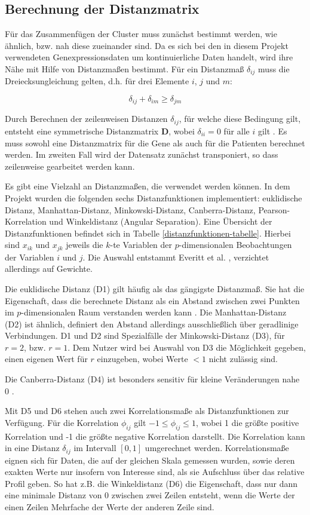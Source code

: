 \documentclass[12pt]{article}
\begin{document}
\subsection{Berechnung der Distanzmatrix}
\label{distanzfunktionen}
Für das Zusammenfügen der Cluster muss zunächst bestimmt werden, wie ähnlich, bzw. nah diese zueinander sind. Da es sich bei den in diesem Projekt verwendeten Genexpressionsdaten um kontinuierliche Daten handelt, wird ihre Nähe mit Hilfe von Distanzmaßen bestimmt. Für ein Distanzmaß $\delta_{ij}$ muss die Dreiecksungleichung gelten, d.h. für drei Elemente $i$, $j$ und $m$:
 
\[ \delta_{ij} + \delta_{im} \ge \delta_{jm} \]

Durch Berechnen der zeilenweisen Distanzen  \( \delta_{ij} \), für welche diese Bedingung gilt, entsteht eine symmetrische Distanzmatrix \( \mathbf{D}\), wobei \( \delta_{ii}  = 0\) für alle \( i \) gilt \cite{Everitt2011}. Es muss sowohl eine Distanzmatrix für die Gene als auch für die Patienten berechnet werden. Im zweiten Fall wird der Datensatz zunächst transponiert, so dass zeilenweise gearbeitet werden kann.

Es gibt eine Vielzahl an Distanzmaßen, die verwendet werden können. In dem Projekt wurden die folgenden sechs Distanzfunktionen implementiert: euklidische Distanz, Manhattan-Distanz, Minkowski-Distanz, Canberra-Distanz, Pearson-Korrelation und Winkeldistanz (Angular Separation). Eine Übersicht der Distanzfunktionen befindet sich in Tabelle \ref{distanzfunktionen-tabelle}. Hierbei sind \( x_{ik} \) und \( x_{jk} \) jeweils die \(k\)-te Variablen der \(p\)-dimensionalen Beobachtungen der Variablen \(i\) und \(j\). Die Auswahl entstammt Everitt et al. \cite{Everitt2011}, verzichtet allerdings auf Gewichte.

Die euklidische Distanz (D1) gilt häufig als das gängigste Distanzmaß. Sie hat die Eigenschaft, dass die berechnete Distanz als ein Abstand zwischen zwei Punkten im $p$-dimensionalen Raum verstanden werden kann \cite{Everitt2011}. Die Manhattan-Distanz (D2) ist ähnlich, definiert den Abstand allerdings ausschließlich über geradlinige Verbindungen. D1 und D2 sind Spezialfälle der Minkowski-Distanz (D3), für $r = 2$, bzw. $r = 1$. Dem Nutzer wird bei Auswahl von D3 die Möglichkeit gegeben, einen eigenen Wert für $r$ einzugeben, wobei Werte $<1$ nicht zulässig sind.

Die Canberra-Distanz (D4) ist besonders sensitiv für kleine Veränderungen nahe 0 \cite{Everitt2011}.

Mit D5 und D6 stehen auch zwei Korrelationsmaße als Distanzfunktionen zur Verfügung. Für die Korrelation \( \phi_{ij}\) gilt \( -1 \le \phi_{ij} \le 1 \), wobei 1 die größte positive Korrelation und -1 die größte negative Korrelation darstellt. Die Korrelation kann in eine Distanz \( \delta_{ij} \) im Intervall \( [0,1] \) umgerechnet werden. Korrelationsmaße eignen sich für Daten, die auf der gleichen Skala gemessen wurden, sowie deren exakten Werte nur insofern von Interesse sind, als sie Aufschluss über das relative Profil geben. So hat z.B. die Winkeldistanz (D6) die Eigenschaft, dass nur dann eine minimale Distanz von 0 zwischen zwei Zeilen entsteht, wenn die Werte der einen Zeilen Mehrfache der Werte der anderen Zeile sind.
\end{document}
